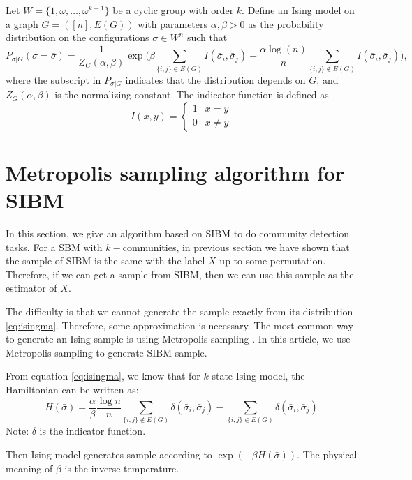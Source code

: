 \documentclass{article}
\begin{document}
	Let $W=\{1, \omega, \dots, \omega^{k-1}\}$ be a cyclic group with order $k$.
	Define an Ising model on a graph $G=([n],E(G))$ with parameters $\alpha,\beta>0$
	as the probability distribution on the configurations $\sigma\in W^n$ such that
	\begin{equation} \label{eq:isingma}
	P_{\sigma|G}(\sigma=\bar{\sigma})=\frac{1}{Z_G(\alpha,\beta)}
	\exp\Big(\beta\sum_{\{i,j\}\in E(G)} I(\bar{\sigma}_i ,\bar{\sigma}_j)
	-\frac{\alpha\log(n)}{n} \sum_{\{i,j\}\notin E(G)} I(\bar{\sigma}_i, \bar{\sigma}_j)\Big) ,
	\end{equation}
	where the subscript in $P_{\sigma|G}$ indicates that the distribution depends on $G$, and 
	$Z_G(\alpha,\beta)$
	is the normalizing constant. The indicator function is defined as
	$$
	I(x ,y) = \begin{cases}
	1 & x = y\\
	0 & x \neq y
	\end{cases}
	$$
	
	\section{Metropolis sampling algorithm for SIBM}
	In this section, we give an algorithm based on SIBM to do community detection tasks.
	For a SBM with $k-$communities, in previous section we have shown that the sample of SIBM is the same with the label $X$ up to some permutation. 
	Therefore, if we can get a sample from SIBM, then we can use this sample as the estimator of $X$.
	
	The difficulty is that we cannot generate the sample exactly from its distribution \eqref{eq:isingma}. Therefore, some approximation is
	necessary. The most common way to generate an Ising sample is using Metropolis sampling \cite{metropolis1953equation}.
	In this article, we use Metropolis sampling to generate SIBM sample.
	
	From equation \eqref{eq:isingma}, we know that for $k$-state Ising model, the Hamiltonian can be written as:
	\begin{equation}
	H(\bar{\sigma}) = \frac{\alpha}{\beta} \frac{\log n}{n} \sum_{\{i,j\}\not\in E(G)} \delta(\bar{\sigma}_i, \bar{\sigma}_j)
		- \sum_{\{i,j\}\in E(G)} \delta(\bar{\sigma}_i, \bar{\sigma}_j)
	\end{equation}
	Note: $\delta$ is the indicator function.
	
	Then Ising model generates sample according to $\exp(-\beta H(\bar{\sigma}))$. The physical meaning of $\beta$ is the inverse temperature.
	
\end{document}
